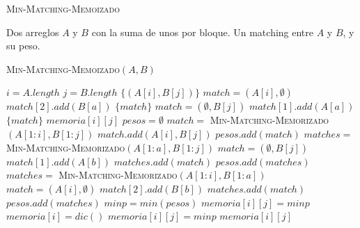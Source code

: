 \documentclass[conference]{IEEEtran}
\begin{document}
\begin{algorithm}
\caption{\textsc{Min-Matching-Memoizado}}
\scriptsize
\begin{algorithmic}
\REQUIRE Dos arreglos $A$ y $B$ con la suma de unos por bloque.
\ENSURE Un matching entre $A$ y $B$, y su peso.
\begin{flushleft}
\textsc{Min-Matching-Memoizado}$(A,B)$
\end{flushleft}
    \STATE $i=A.length$
    \STATE $j=B.length$
        \RETURN $\{(A[i],B[j])\}$
            \STATE $match=(A[i],\emptyset)$
                \STATE $match[2].add(B[a])$
            \ENDFOR
            \RETURN $\{match\}$
        \ELSE
            \STATE $match=(\emptyset,B[j])$
                \STATE $match[1].add(A[a])$
            \ENDFOR
            \RETURN $\{match\}$
        \ENDIF
    \ELSE
                \RETURN $memoria[i][j]$
            \ENDIF
        \ENDIF
        \STATE $pesos=\emptyset$
        \STATE $match=$ \textsc{Min-Matching-Memorizado}$(A[1:i],B[1:j])$
        \STATE $match.add(A[i],B[j])$
        \STATE $pesos.add(match)$
            \STATE $matches=$ \textsc{Min-Matching-Memorizado}$(A[1:a],B[1:j])$
            \STATE $match=(\emptyset,B[j])$
                \STATE $match[1].add(A[b])$
            \ENDFOR
            \STATE $matches.add(match)$
            \STATE $pesos.add(matches)$
        \ENDFOR
            \STATE $matches=$ \textsc{Min-Matching-Memorizado}$(A[1:i],B[1:a])$
            \STATE $match=(A[i],\emptyset)$
                \STATE $match[2].add(B[b])$
            \ENDFOR
            \STATE $matches.add(match)$
            \STATE $pesos.add(matches)$
        \ENDFOR
        \STATE $minp = min(pesos)$
            \STATE $memoria[i][j] = minp$
        \ELSE
            \STATE $memoria[i] = dic()$
            \STATE $memoria[i][j] = minp$
        \ENDIF
        \RETURN $memoria[i][j]$
    \ENDIF
\end{algorithmic}
\label{alg:min-matching-memoizado}
\end{algorithm}
\verb||\\
\end{document}
